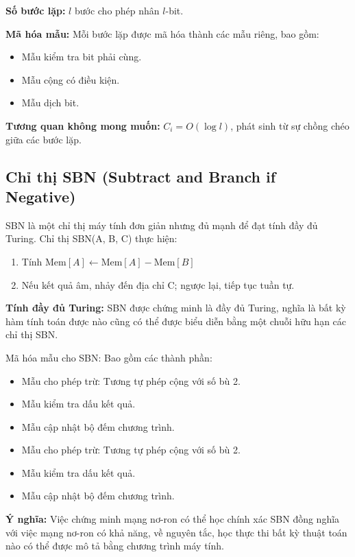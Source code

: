 \textbf{Số bước lặp:} $l$ bước cho phép nhân $l$-bit.

\vspace{0.3cm}

\textbf{Mã hóa mẫu:} Mỗi bước lặp được mã hóa thành các mẫu riêng, bao gồm:

\begin{itemize}
    \item Mẫu kiểm tra bit phải cùng.
    \item Mẫu cộng có điều kiện.
    \item Mẫu dịch bit.
\end{itemize}

\vspace{-0.1cm}

\textbf{Tương quan không mong muốn:} $C_i = O(\log l)$, phát sinh từ sự chồng chéo giữa các bước lặp.

\subsection{Chỉ thị SBN (Subtract and Branch if Negative)}

SBN là một chỉ thị máy tính đơn giản nhưng đủ mạnh để đạt tính đầy đủ Turing. Chỉ thị SBN(A, B, C) thực hiện:
\begin{enumerate}
    \item Tính $\text{Mem}[A] \leftarrow \text{Mem}[A] - \text{Mem}[B]$
    \item Nếu kết quả âm, nhảy đến địa chỉ C; ngược lại, tiếp tục tuần tự.
\end{enumerate}

\textbf{Tính đầy đủ Turing:} SBN được chứng minh là đầy đủ Turing, nghĩa là bất kỳ hàm tính toán được nào cũng có thể được biểu diễn bằng một chuỗi hữu hạn các chỉ thị SBN.

Mã hóa mẫu cho SBN: Bao gồm các thành phần:
\begin{itemize}
    \item Mẫu cho phép trừ: Tương tự phép cộng với số bù 2.
    \item Mẫu kiểm tra dấu kết quả.
    \item Mẫu cập nhật bộ đếm chương trình.
    \item Mẫu cho phép trừ: Tương tự phép cộng với số bù 2.
    \item Mẫu kiểm tra dấu kết quả.
    \item Mẫu cập nhật bộ đếm chương trình.
\end{itemize}

\textbf{Ý nghĩa:} Việc chứng minh mạng nơ-ron có thể học chính xác SBN đồng nghĩa với việc mạng nơ-ron có khả năng, về nguyên tắc, học thực thi bất kỳ thuật toán nào có thể được mô tả bằng chương trình máy tính.

